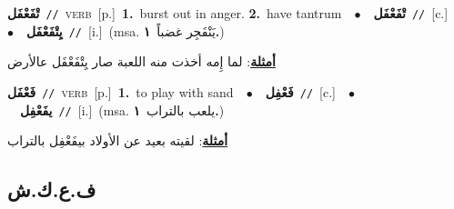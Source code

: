 \documentclass[10pt,a4paper,twoside]{article} %
\begin{document}
\begin{multicols}{2}
{\setlength\topsep{0pt}\textbf{\foreignlanguage{arabic}{تْفَعْفَل}}\ {\color{gray}\texttt{//}\color{black}}\ \textsc{verb}\ [p.]\ \textbf{1.}~burst out in anger.  \textbf{2.}~have tantrum\ \ $\bullet$\ \ \setlength\topsep{0pt}\textbf{\foreignlanguage{arabic}{تْفَعْفَل}}\ {\color{gray}\texttt{//}\color{black}}\ [c.]\ \ $\bullet$\ \ \setlength\topsep{0pt}\textbf{\foreignlanguage{arabic}{يِتْفَعْفَل}}\ {\color{gray}\texttt{//}\color{black}}\ [i.]\ \color{gray}(msa. \foreignlanguage{arabic}{يَنْفَجِر غضباً}~\foreignlanguage{arabic}{\textbf{١.}})\color{black}\  \begin{flushright}\color{gray}\foreignlanguage{arabic}{\textbf{\underline{\foreignlanguage{arabic}{أمثلة}}}: لما إِمه أخذت منه اللعبة صار يِتْفَعْفَل عالأرض}\end{flushright}\color{black}} \vspace{2mm}

{\setlength\topsep{0pt}\textbf{\foreignlanguage{arabic}{فَعْفَل}}\ {\color{gray}\texttt{//}\color{black}}\ \textsc{verb}\ [p.]\ \textbf{1.}~to play with sand\ \ $\bullet$\ \ \setlength\topsep{0pt}\textbf{\foreignlanguage{arabic}{فَعْفِل}}\ {\color{gray}\texttt{//}\color{black}}\ [c.]\ \ $\bullet$\ \ \setlength\topsep{0pt}\textbf{\foreignlanguage{arabic}{يفَعْفِل}}\ {\color{gray}\texttt{//}\color{black}}\ [i.]\ \color{gray}(msa. \foreignlanguage{arabic}{يلعب بالتراب}~\foreignlanguage{arabic}{\textbf{١.}})\color{black}\  \begin{flushright}\color{gray}\foreignlanguage{arabic}{\textbf{\underline{\foreignlanguage{arabic}{أمثلة}}}: لقيته بعيد عن الأولاد بيفَعْفِل بالتراب}\end{flushright}\color{black}} \vspace{2mm}

\vspace{-3mm}
\subsection*{\color{blue}\foreignlanguage{arabic}{ف.ع.ك.ش}\color{blue}{}} 


\end{multicols}
\end{document}
